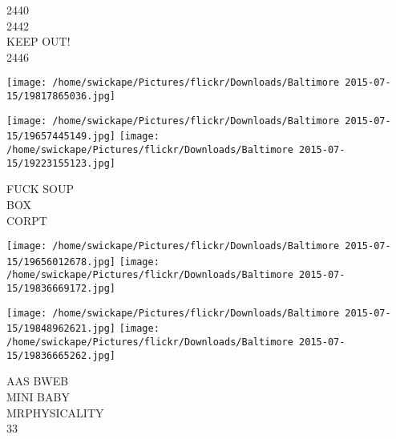 \documentclass[10pt,letterpaper]{article}
\begin{document}
2440\\
2442\\
KEEP OUT!\\
2446
\pagebreak

\texttt{[image: /home/swickape/Pictures/flickr/Downloads/Baltimore 2015-07-15/19817865036.jpg]}

\vspace{0.25in}
\texttt{[image: /home/swickape/Pictures/flickr/Downloads/Baltimore 2015-07-15/19657445149.jpg]}
\texttt{[image: /home/swickape/Pictures/flickr/Downloads/Baltimore 2015-07-15/19223155123.jpg]}

FUCK SOUP\\
BOX\\
CORPT
\pagebreak

\texttt{[image: /home/swickape/Pictures/flickr/Downloads/Baltimore 2015-07-15/19656012678.jpg]}
\texttt{[image: /home/swickape/Pictures/flickr/Downloads/Baltimore 2015-07-15/19836669172.jpg]}

\texttt{[image: /home/swickape/Pictures/flickr/Downloads/Baltimore 2015-07-15/19848962621.jpg]}
\texttt{[image: /home/swickape/Pictures/flickr/Downloads/Baltimore 2015-07-15/19836665262.jpg]}

AAS BWEB\\
MINI BABY\\
MRPHYSICALITY\\
33
\pagebreak
\end{document}
